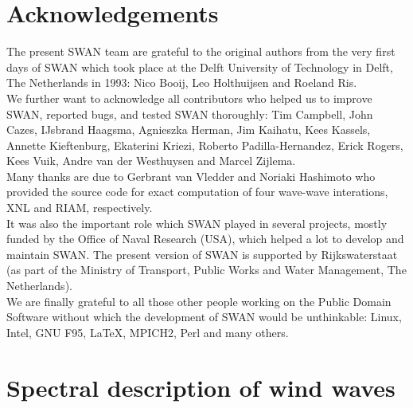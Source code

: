 \documentclass[12pt]{book}
\begin{document}
\section{Acknowledgements} \label{sec:acknow}

The present SWAN team are grateful to the original authors from the very first days of SWAN which took place at
the Delft University of Technology in Delft, The Netherlands in 1993: Nico Booij, Leo Holthuijsen and Roeland Ris.
\\[2ex]
\noindent
We further want to acknowledge all contributors who helped us to improve SWAN, reported bugs, and tested SWAN
thoroughly: Tim Campbell, John Cazes, IJsbrand Haagsma, Agnieszka Herman, Jim Kaihatu, Kees Kassels, Annette Kieftenburg,
Ekaterini Kriezi, Roberto Padilla-Hernandez, Erick Rogers, Kees Vuik, Andre van der Westhuysen and Marcel Zijlema.
\\[2ex]
\noindent
Many thanks are due to Gerbrant van Vledder and Noriaki Hashimoto who provided the source code for exact
computation of four wave-wave interations, XNL and RIAM, respectively.
\\[2ex]
\noindent
It was also the important role which SWAN played in several projects, mostly funded by the Office of Naval
Research (USA), which helped a lot to develop and maintain SWAN. The present version of SWAN is supported by
Rijkswaterstaat (as part of the Ministry of Transport, Public Works and Water Management, The Netherlands).
\\[2ex]
\noindent
We are finally grateful to all those other people working on the Public Domain Software without which the development
of SWAN would be unthinkable: Linux, Intel, GNU F95, \LaTeX, MPICH2, Perl and many others.

 \label{ch:goveq}

\section{Spectral description of wind waves}
\end{document}

